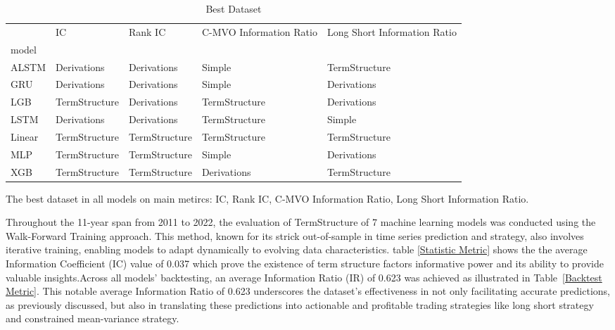 \documentclass[10pt,letterpaper]{article}
\begin{document}
\begin{table}[!ht]
\begin{adjustwidth}{-2.25in}{0in} %
\centering
\caption{Best Dataset}
\label{Best Dataset}
\begin{tabular}{lllll}
\toprule
{} &             IC &        Rank IC & C-MVO Information Ratio & Long Short Information Ratio \\
model  &                &                &                         &                              \\
\midrule
ALSTM  &    Derivations &    Derivations &                  Simple &                TermStructure \\
GRU    &    Derivations &    Derivations &                  Simple &                  Derivations \\
LGB    &  TermStructure &    Derivations &           TermStructure &                  Derivations \\
LSTM   &    Derivations &    Derivations &           TermStructure &                       Simple \\
Linear &  TermStructure &  TermStructure &           TermStructure &                TermStructure \\
MLP    &  TermStructure &  TermStructure &                  Simple &                  Derivations \\
XGB    &  TermStructure &  TermStructure &             Derivations &                TermStructure \\
\bottomrule
\end{tabular}
\begin{flushleft} The best dataset in all models on main metircs: IC, Rank IC, C-MVO Information Ratio, Long Short Information Ratio.
\end{flushleft}
\label{table1}
\end{adjustwidth}
\end{table}
Throughout the 11-year span from 2011 to 2022, the evaluation of TermStructure of 7 machine learning models was conducted using the Walk-Forward Training approach. This method, known for its strick out-of-sample in time series prediction and strategy, also involves iterative training, enabling models to adapt dynamically to evolving data characteristics.
table \ref{Statistic Metric} shows the the average Information Coefficient (IC) value of 0.037 which prove the existence of term structure factors informative power and its ability to provide valuable insights.Across all models' backtesting, an average Information Ratio (IR) of 0.623 was achieved as illustrated in  Table~\ref{Backtest Metric}. This notable average Information Ratio of 0.623 underscores the dataset's effectiveness in not only facilitating accurate predictions, as previously discussed, but also in translating these predictions into actionable and profitable trading strategies like long short strategy and constrained mean-variance strategy.
\end{document}
